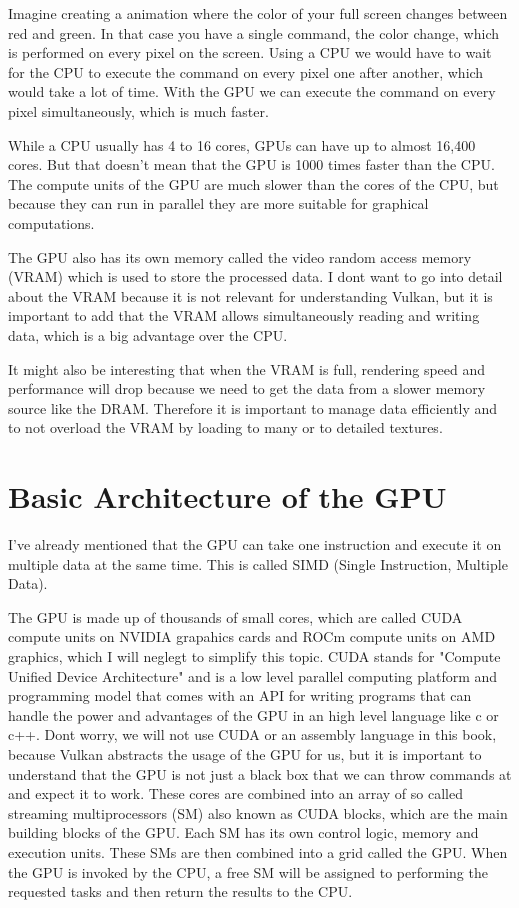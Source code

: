\documentclass[12pt]{report} \usepackage {preamble}
\begin{document}
Imagine creating a animation where the color of your full screen changes
between red and green. In that case you have a single command, the color
change, which is performed on every pixel on the screen. Using a CPU
we would have to wait for the CPU to execute the command on every pixel
one after another, which would take a lot of time. With the GPU we can
execute the command on every pixel simultaneously, which is much faster.

While a CPU usually has 4 to 16 cores, GPUs can have up to almost 16,400
cores. \cite{NVIDIA-rtx-4090} But that doesn't mean that the GPU is 1000
times faster than the CPU. The compute units of the GPU are much slower
than the cores of the CPU, but because they can run in parallel they are
more suitable for graphical computations. \cite{CUDA_Programming_Guide}

The GPU also has its own memory called the video random access memory
(VRAM) which is used to store the processed data. I dont want to go into
detail about the VRAM because it is not relevant for understanding Vulkan,
but it is important to add that the VRAM allows simultaneously reading
and writing data, which is a big advantage over the CPU. \cite{vram}

It might also be interesting that when the VRAM is full, rendering
speed and performance will drop because we need to get the data from a
slower memory source like the DRAM.  Therefore it is important to manage
data efficiently and to not overload the VRAM by loading to many or to
detailed textures.

\section {Basic Architecture of the GPU}

I've already mentioned that the GPU can take one instruction and
execute it on multiple data at the same time. This is called SIMD
(Single Instruction, Multiple Data). \cite{cherry_gpu_architecture}

The GPU is made up of thousands of small cores, which are called CUDA
compute units on NVIDIA grapahics cards \cite{CUDA_Programming_Guide}
and ROCm compute units on AMD graphics, which I will neglegt to
simplify this topic. \cite{rocm} CUDA stands for "Compute Unified
Device Architecture" and is a low level parallel computing platform
and programming model that comes with an API for writing programs
that can handle the power and advantages of the GPU in an high level
language like c or c++. \cite{CUDA_Programming_Guide} Dont worry, we
will not use CUDA or an assembly language in this book, because Vulkan
abstracts the usage of the GPU for us, but it is important to understand
that the GPU is not just a black box that we can throw commands at and
expect it to work. These cores are combined into an array of so called
streaming multiprocessors (SM) also known as CUDA blocks, which are the
main building blocks of the GPU.  Each SM has its own control logic,
memory and execution units. \cite{CUDA_Programming_Guide} These SMs are
then combined into a grid called the GPU.  When the GPU is invoked by
the CPU, a free SM will be assigned to performing the requested tasks
and then return the results to the CPU. \cite{CUDA_Programming_Guide}
\end{document}
